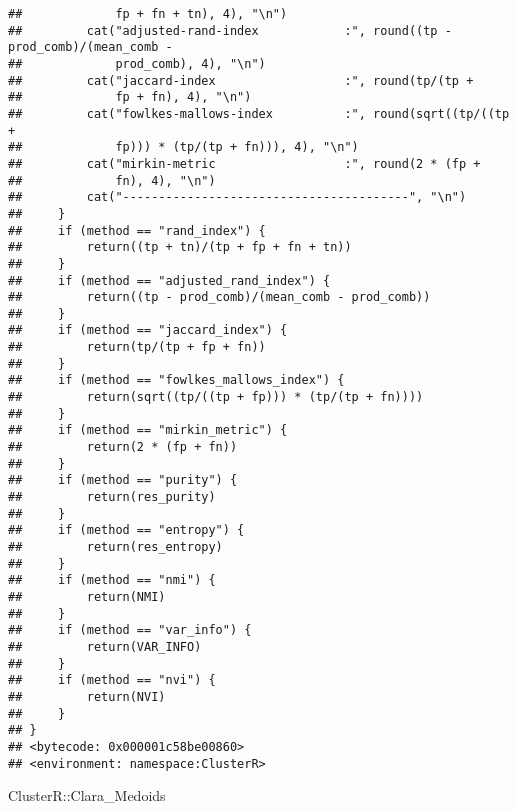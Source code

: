 \documentclass[
]{article}
\newenvironment{Shaded}{\begin{snugshade}}{\end{snugshade}}
\newcommand{\NormalTok}[1]{#1}
\newcommand{\SpecialCharTok}[1]{\textcolor[rgb]{0.00,0.00,0.00}{#1}}
\begin{document}
\begin{verbatim}
##             fp + fn + tn), 4), "\n")
##         cat("adjusted-rand-index            :", round((tp - prod_comb)/(mean_comb - 
##             prod_comb), 4), "\n")
##         cat("jaccard-index                  :", round(tp/(tp + 
##             fp + fn), 4), "\n")
##         cat("fowlkes-mallows-index          :", round(sqrt((tp/((tp + 
##             fp))) * (tp/(tp + fn))), 4), "\n")
##         cat("mirkin-metric                  :", round(2 * (fp + 
##             fn), 4), "\n")
##         cat("----------------------------------------", "\n")
##     }
##     if (method == "rand_index") {
##         return((tp + tn)/(tp + fp + fn + tn))
##     }
##     if (method == "adjusted_rand_index") {
##         return((tp - prod_comb)/(mean_comb - prod_comb))
##     }
##     if (method == "jaccard_index") {
##         return(tp/(tp + fp + fn))
##     }
##     if (method == "fowlkes_mallows_index") {
##         return(sqrt((tp/((tp + fp))) * (tp/(tp + fn))))
##     }
##     if (method == "mirkin_metric") {
##         return(2 * (fp + fn))
##     }
##     if (method == "purity") {
##         return(res_purity)
##     }
##     if (method == "entropy") {
##         return(res_entropy)
##     }
##     if (method == "nmi") {
##         return(NMI)
##     }
##     if (method == "var_info") {
##         return(VAR_INFO)
##     }
##     if (method == "nvi") {
##         return(NVI)
##     }
## }
## <bytecode: 0x000001c58be00860>
## <environment: namespace:ClusterR>
\end{verbatim}

\begin{Shaded}
\begin{Highlighting}[]
\NormalTok{ClusterR}\SpecialCharTok{::}\NormalTok{Clara\_Medoids}
\end{Highlighting}
\end{Shaded}
\end{document}
